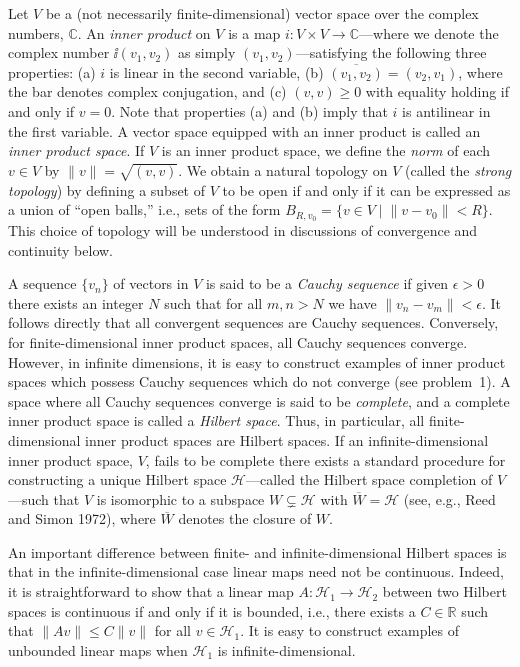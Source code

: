 Let \(V\) be a (not necessarily finite-dimensional) vector space over the complex
numbers, \(\mathbb C\). An \emph{inner product} on \(V\) is a map
\(i:V\times V\longrightarrow\mathbb C\)---where we denote the complex number
\(\ii(v_1,v_2)\) as simply \((v_1,v_2)\)---satisfying the following three properties:
(a) \(i\) is linear in the second variable, (b)
\(\overline{(v_1,v_2)}=(v_2,v_1)\), where the bar denotes complex conjugation,
and (c) \((v,v)\geq 0\) with equality holding if and only if \(v=0\). Note that
properties (a) and (b) imply that \(i\) is antilinear in the first variable. A vector
space equipped with an inner product is called an \emph{inner product space}. If
\(V\) is an inner product space, we define the \emph{norm} of each \(v\in V\) by
\(\lVert v\rVert=\sqrt{(v,v)}\). We obtain a natural topology on \(V\) (called the
\emph{strong topology}) by defining a subset of \(V\) to be open if and only if it can
be expressed as a union of ``open balls,'' i.e., sets of the form
\(B_{R,v_0}=\{v\in V\mid \lVert v-v_0\rVert<R\}\). This choice of topology will
be understood in discussions of convergence and continuity below.

A sequence \(\{v_n\}\) of vectors in \(V\) is said to be a \emph{Cauchy sequence}
if given \(\epsilon>0\) there exists an integer \(N\) such that for all \(m,n>N\) we
have \(\lVert v_n-v_m\rVert<\epsilon\). It follows directly that all convergent
sequences are Cauchy sequences. Conversely, for finite-dimensional inner product
spaces, all Cauchy sequences converge. However, in infinite dimensions, it is easy to
construct examples of inner product spaces which possess Cauchy sequences which do
not converge (see problem~1). A space where all Cauchy sequences converge is said
to be \emph{complete}, and a complete inner product space is called a \emph{Hilbert
space}. Thus, in particular, all finite-dimensional inner product spaces are Hilbert
spaces. If an infinite-dimensional inner product space, \(V\), fails to be complete
there exists a standard procedure for constructing a unique Hilbert space
\(\mathcal H\)---called the Hilbert space completion of \(V\)---such that \(V\) is
isomorphic to a subspace \(W\subsetneq\mathcal H\) with
\(\overline W=\mathcal H\) (see, e.g., Reed and Simon 1972), where
\(\overline W\) denotes the closure of \(W\).

An important difference between finite- and infinite-dimensional Hilbert spaces is
that in the infinite-dimensional case linear maps need not be continuous. Indeed, it
is straightforward to show that a linear map
\(A:\mathcal H_1\longrightarrow\mathcal H_2\) between two Hilbert spaces is
continuous if and only if it is bounded, i.e., there exists a \(C\in\mathbb R\) such
that \(\lVert Av\rVert\leq C\lVert v\rVert\) for all \(v\in\mathcal H_1\). It is
easy to construct examples of unbounded linear maps when \(\mathcal H_1\) is
infinite-dimensional.

